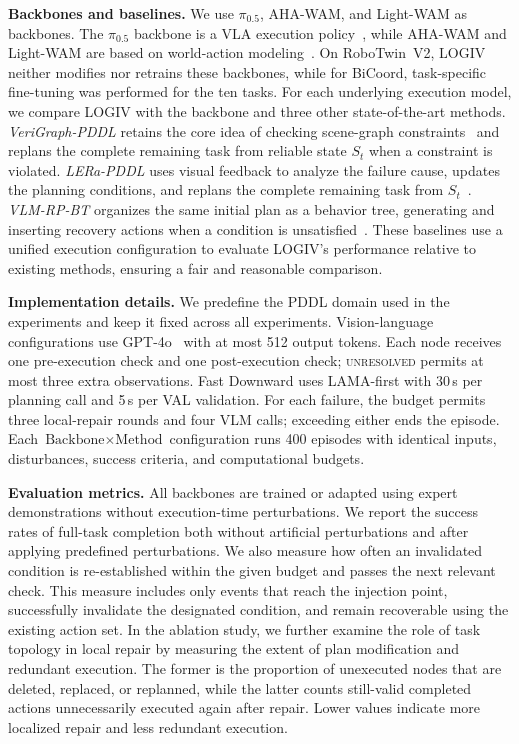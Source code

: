 \documentclass[letterpaper,10pt,conference]{ieeeconf}
\newcommand{\method}{LOGIV\xspace}
\begin{document}
\textbf{Backbones and baselines.}
We use $\pi_{0.5}$, AHA-WAM, and Light-WAM as backbones. The $\pi_{0.5}$ backbone is a VLA execution policy~\cite{intelligence2025pi_}, while AHA-WAM and Light-WAM are based on world-action modeling~\cite{cai2026aha,li2026light}. On RoboTwin~V2, \method neither modifies nor retrains these backbones, while for BiCoord, task-specific fine-tuning was performed for the ten tasks. For each underlying execution model, we compare LOGIV with the backbone and three other state-of-the-art methods. \emph{VeriGraph-PDDL} retains the core idea of checking scene-graph constraints~\cite{ekpo2024verigraph} and replans the complete remaining task from reliable state $S_t$ when a constraint is violated. \emph{LERa-PDDL} uses visual feedback to analyze the failure cause, updates the planning conditions, and replans the complete remaining task from $S_t$~\cite{pchelintsev2025lera}. \emph{VLM-RP-BT} organizes the same initial plan as a behavior tree, generating and inserting recovery actions when a condition is unsatisfied~\cite{colledanchise2016behavior,iovino2022survey}. These baselines use a unified execution configuration to evaluate \method's performance relative to existing methods, ensuring a fair and reasonable comparison.

\textbf{Implementation details.}
We predefine the PDDL domain used in the experiments and keep it fixed across all experiments. Vision-language configurations use GPT-4o~\cite{hurst2024gpt} with at most 512 output tokens. Each node receives one pre-execution check and one post-execution check; \textsc{unresolved} permits at most three extra observations. Fast Downward uses LAMA-first with 30\,s per planning call and 5\,s per VAL validation. For each failure, the budget permits three local-repair rounds and four VLM calls; exceeding either ends the episode. Each $\text{Backbone}\times\text{Method}$ configuration runs 400 episodes with identical inputs, disturbances, success criteria, and computational budgets.

\textbf{Evaluation metrics.}
All backbones are trained or adapted using expert demonstrations without execution-time perturbations. We report the success rates of full-task completion both without artificial perturbations and after applying predefined perturbations. We also measure how often an invalidated condition is re-established within the given budget and passes the next relevant check. This measure includes only events that reach the injection point, successfully invalidate the designated condition, and remain recoverable using the existing action set. In the ablation study, we further examine the role of task topology in local repair by measuring the extent of plan modification and redundant execution. The former is the proportion of unexecuted nodes that are deleted, replaced, or replanned, while the latter counts still-valid completed actions unnecessarily executed again after repair. Lower values indicate more localized repair and less redundant execution.
\end{document}
